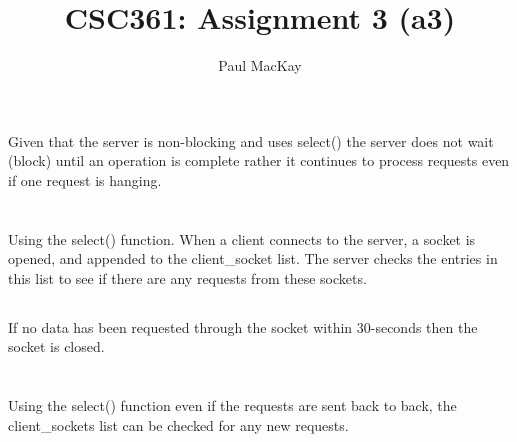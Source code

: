 \documentclass{article}
\title{CSC361: Assignment 3 (a3)}
\author{Paul MacKay}
\begin{document}
\maketitle


\section{}
Given that the server is non-blocking and uses select() 
the server does not wait (block) until an operation is complete rather it continues 
to process requests even if one request is hanging. 

\section{}
\subsection{}
Using the select() function. When a client connects to the server, a socket is opened,
and appended to the client\_socket list. The server checks the entries in this list 
to see if there are any requests from these sockets.  
\subsection{}
If no data has been requested through the socket within 30-seconds then the socket is closed.

\section{}
Using the select() function even if the requests are sent back to back, the client\_sockets 
list can be checked for any new requests.
\end{document}
